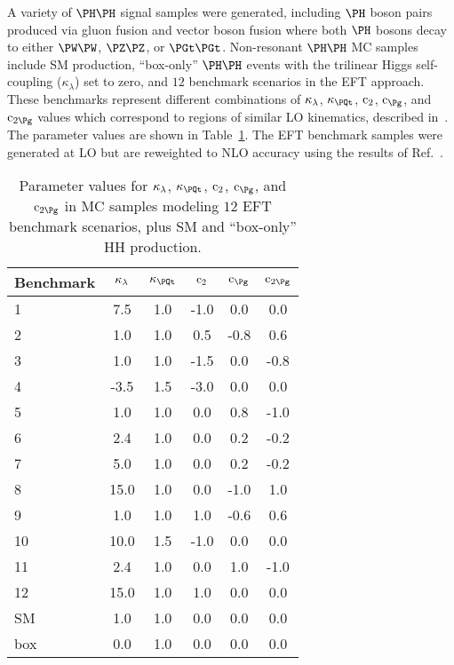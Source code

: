 A variety of $\HH$ signal samples were generated, including $\PHiggs$ boson pairs produced via gluon
fusion and vector boson fusion where both $\PHiggs$ bosons decay to either $\PW\PW$, $\PZ\PZ$, or $\PGt\PGt$.
Non-resonant $\HH$ MC samples include SM production, ``box-only'' $\HH$ events with
the trilinear Higgs self-coupling ($\kappa_{\lambda}$) set to zero, and $12$ benchmark scenarios
in the EFT approach.  These benchmarks represent different combinations of
$\kappa_{\lambda}$, $\kappat$, $\text{c}_{2}$, $\cg$, and $\cgg$ values which correspond
to regions of similar LO kinematics, described in~\cite{Carvalho:2015ttv}.  The parameter
values are shown in Table~\ref{tab:HH_benchmarks}.  The EFT benchmark samples were
generated at LO but are reweighted to NLO accuracy using the results of Ref.~\cite{Buchalla:2018yce}.

\begin{table}[!h]
\begin{center}
\begin{tabular}{|l|c|c|c|c|c|} \hline
Benchmark & $\kappa_{\lambda}$  & $\kappat$ & $\text{c}_{2}$ & $\cg$ &  $\cgg$ \\
\hline
1         & 7.5        & 1.0       & -1.0    & 0.0   & 0.0  \\
2         & 1.0        & 1.0       &  0.5    & -0.8  & 0.6  \\
3         & 1.0        & 1.0       & -1.5    & 0.0   & -0.8 \\
4         & -3.5       & 1.5       & -3.0    & 0.0   & 0.0  \\
5         & 1.0        & 1.0       & 0.0     & 0.8   & -1.0 \\
6         & 2.4        & 1.0       & 0.0     & 0.2   & -0.2 \\
7         & 5.0        & 1.0       & 0.0     & 0.2   & -0.2 \\
8         & 15.0       & 1.0       & 0.0     & -1.0  & 1.0  \\
9         & 1.0        & 1.0       & 1.0     & -0.6  & 0.6  \\
10        & 10.0       & 1.5       & -1.0    & 0.0   & 0.0  \\
11        & 2.4        & 1.0       & 0.0     & 1.0   & -1.0 \\
12        & 15.0       & 1.0       & 1.0     & 0.0   & 0.0  \\
\hline
SM        & 1.0        & 1.0       & 0.0     & 0.0   & 0.0  \\
box       & 0.0        & 1.0       & 0.0     & 0.0   & 0.0  \\
\hline
\end{tabular}
\end{center}
\caption{
  Parameter values for $\kappa_{\lambda}$, $\kappat$, $\text{c}_{2}$, $\cg$, and
  $\cgg$ in MC samples modeling $12$ EFT benchmark scenarios, plus SM
  and ``box-only'' HH production.
}
\label{tab:HH_benchmarks}
\end{table}


